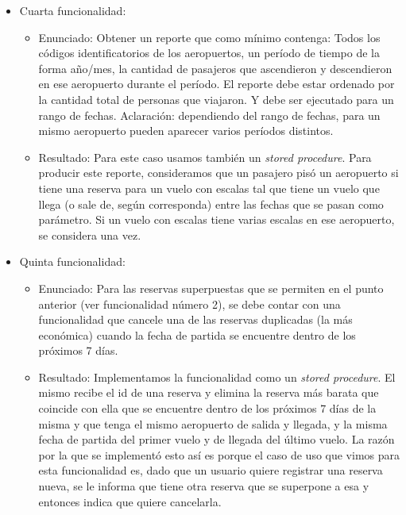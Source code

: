 \begin{itemize}
\begin{itemize}
			Esta restricci\'on la implementamos mediante un \textit{trigger} en la inserci\'on de una reserva. 
			
			
		\end{itemize}
	
	\item Cuarta funcionalidad:
		\begin{itemize}
			\item Enunciado: Obtener un reporte que como m\'inimo contenga: Todos los c\'odigos identificatorios de los
			aeropuertos, un per\'iodo de tiempo de la forma a\~no/mes, la cantidad de pasajeros que ascendieron y
			descendieron en ese aeropuerto durante el per\'iodo. El reporte debe estar ordenado por la cantidad total de personas
			que viajaron. Y debe ser ejecutado para un rango de fechas. Aclaraci\'on: dependiendo del rango de fechas, para
			un mismo aeropuerto pueden aparecer varios per\'iodos distintos.

		\item Resultado: Para este caso usamos tambi\'en un \textit{stored procedure}.
			Para producir este reporte, consideramos que un pasajero pis\'o un aeropuerto si tiene una reserva
			para un vuelo con escalas tal que tiene un vuelo que llega (o sale de, seg\'un corresponda) entre las fechas que se
			pasan como par\'ametro. Si un vuelo con escalas tiene varias escalas en ese aeropuerto, se considera una vez.

			
		\end{itemize}

	\item Quinta funcionalidad:
		\begin{itemize}
			\item Enunciado: Para las reservas superpuestas que se permiten en el punto anterior (ver funcionalidad n\'umero
			2), se debe contar con una funcionalidad que cancele una de las reservas duplicadas (la m\'as econ\'omica) cuando
			la fecha de partida se encuentre dentro de los pr\'oximos 7 d\'ias.

		\item Resultado: Implementamos la funcionalidad como un \textit{stored procedure}. El mismo recibe el id de una reserva y
			elimina la reserva m\'as barata que coincide con ella que se encuentre dentro de los pr\'oximos 7 d\'ias de la
			misma y que tenga el mismo aeropuerto de salida y llegada, y la misma fecha de partida del primer vuelo y de
			llegada del \'ultimo vuelo. La raz\'on por la que se implement\'o esto as\'i es porque el caso de uso que vimos para
			esta funcionalidad es, dado que un usuario quiere registrar una reserva nueva, se le informa que tiene otra reserva
			que se superpone a esa y entonces indica que quiere cancelarla.

			
		\end{itemize}

\end{itemize}

